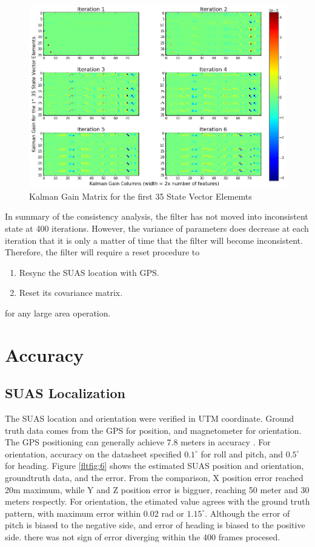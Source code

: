 \begin{figure}[h]
\centering
\includegraphics[width=14cm, keepaspectratio=true]
{./Figures/fltfig/cut1/Figure113.png}
\caption{Kalman Gain Matrix for the first 35 State Vector Elememts}
\label{fltfig:5}
\end{figure}

In summary of the consistency analysis, the filter has not moved into
inconsistent state at 400 iterations. However, the variance of
parameters does decrease at each iteration that it is only a matter of
time that the filter will become inconsistent. Therefore, the filter
will require a reset procedure to 

\begin{enumerate}
  \item Resync the SUAS location with GPS. 
  \item Reset its covariance matrix. 
\end{enumerate}

\noindent for any large area operation. 

\section{Accuracy}
\subsection{SUAS Localization}

The SUAS location and orientation were verified in UTM coordinate.
Ground truth data comes from the GPS for position, and magnetometer
for orientation. The GPS positioning can generally achieve 7.8 meters
in accuracy \cite{GPS_ACCURACY}. For orientation, accuracy on the
datasheet specified $0.1^{\circ}$ for roll and pitch, and
$0.5^{\circ}$ for heading. Figure \ref{fltfig:6} shows the estimated
SUAS position and orientation, groundtruth data, and the error. From
the comparison, X position error reached 20m maximum, while Y and Z
position error is bigguer, reaching 50 meter and 30 meters respectly.
For orientation, the etimated value agrees with the ground truth
pattern, with maximum error within 0.02 rad or $1.15^{\circ}$.
Although the error of pitch is biased to the negative side, and error
of heading is biased to the positive side. there was not sign of error
diverging within the 400 frames procesed.

